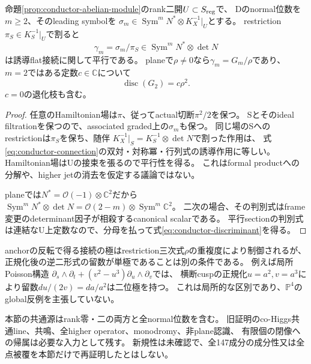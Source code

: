 \begin{proposition}\label{prop:conductor-leading-transport}
命題\ref{prop:conductor-abelian-module}のrank二開$U\subset S_{\rm reg}$で、
Dのnormal位数を$m\ge2$、そのleading symbolを
$\sigma_m\in\operatorname{Sym}^mN^*\otimes K_X^{-1}|_U$とする。
restriction $\pi_S\in K_S^{-1}|_U$で割ると
\[
 \gamma_m=\sigma_m/\pi_S\in\operatorname{Sym}^mN^*\otimes\det N
\]
は誘導flat接続に関して平行である。
planeで$\rho\ne0$なら$\gamma_m=G_m/\rho$であり、
$m=2$ではある定数$c\in\mathbb C$について
\begin{equation}
 \operatorname{disc}(G_2)=c\rho^2 .\label{eq:conductor-discriminant}
\end{equation}
$c=0$の退化枝も含む。
\end{proposition}
\begin{proof}
任意のHamiltonian場は$\pi$、従ってactual切断$\pi^2/2$を保つ。
Sとそのideal filtrationを保つので、associated graded上の$\sigma_m$も保つ。
同じ場のSへのrestrictionは$\pi_S$を保ち、随伴
$K_X^{-1}|_S=K_S^{-1}\otimes\det N$で割った作用は、
式\eqref{eq:conductor-connection}の双対・対称冪・行列式の誘導作用に等しい。
Hamiltonian場はUの接束を張るので平行性を得る。
これはformal productへの分解や、higher jetの消去を仮定する議論ではない。

planeでは$N^*=\mathcal O(-1)\otimes\mathbb C^2$だから
$\operatorname{Sym}^mN^*\otimes\det N=\mathcal O(2-m)\otimes\operatorname{Sym}^m\mathbb C^2$。
二次の場合、その判別式はframe変更のdeterminant因子が相殺するcanonical scalarである。
平行sectionの判別式は連結なU上定数なので、分母を払って式\eqref{eq:conductor-discriminant}を得る。
\end{proof}
anchorの反転で得る接続の極はrestriction三次式$\rho$の重複度により制御されるが、
正規化後の逆二形式の留数が単極であることは別の条件である。
例えば局所Poisson構造
$\partial_s\wedge\partial_t+(v^2-u^3)\partial_u\wedge\partial_v$では、
横断cuspの正規化$u=a^2,v=a^3$により留数$du/(2v)=da/a^2$は二位極を持つ。
これは局所的な区別であり、$\mathbb P^4$のglobal反例を主張していない。

本節の共通源はrank零・二の両方と全normal位数を含む。
旧証明のco-Higgs共通line、共鳴、全higher operator、monodromy、非plane認識、
有限個の閉像への帰属は必要な入力として残す。
新規性は未確認で、全147成分の成分性又は全点被覆を本節だけで再証明したとはしない。
